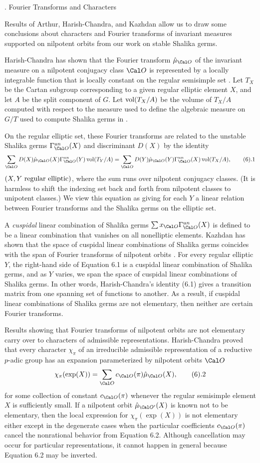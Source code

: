 . Fourier Transforms and Characters\endhead

Results of Arthur, Harish-Chandra, and Kazhdan allow us to draw some
conclusions about characters and Fourier transforms of invariant
measures supported on nilpotent
orbits from our work on stable Shalika germs.

Harish-Chandra has shown that the Fourier transform $\hat\mu_\O$ of
the invariant measure on a nilpotent conjugacy class $\O$ is
represented by a locally integrable function
that  is locally  constant
on the regular semisimple set \cite{HC}.  
Let $T_X$ be the Cartan subgroup corresponding to a given
regular elliptic element $X$, and let $A$ be the split
component of $G$.  Let $\operatorname{vol}(T_X/A)$ be the volume
of $T_X/A$ computed with respect to the measure 
used to define the algebraic measure on $G/T$ used
to compute Shalika germs in \cite{L}.

On the regular elliptic set, these Fourier
transforms are related to the
unstable Shalika germs $\Gamma^{un}_\O(X)$ 
and discriminant $D(X)$ by the identity \cite{HC}
$$\sum_\O D(X)\hat\mu_\O(X)\Gamma^{un}_\O(Y)\vvol(T_Y/A) = 
   \sum_\O D(Y)\hat\mu_\O(Y) \Gamma^{un}_\O(X)\vvol(T_X/A),
\tag6.1$$
$(X,Y \ \hbox{regular elliptic})$,
where the sum runs over nilpotent conjugacy classes.  (It is harmless
to shift the indexing set back and forth from nilpotent classes to
unipotent classes.)  We view this equation as giving for each $Y$ a
linear relation between Fourier transforms
 and
the Shalika germs
 on the elliptic set.

A {\it cuspidal\/} linear combination of Shalika germs
$\sum x_\O \Gamma^{un}_\O(X)$ is defined to be a linear combination that
vanishes on all nonelliptic elements.  Kazhdan has shown that the
space of cuspidal linear combinations of Shalika germs coincides with
the span of Fourier transforms of nilpotent orbits \cite{K}. For every
regular elliptic $Y$, the right-hand side of Equation 6.1 is a cuspidal
linear combination of Shalika germs, and as
$Y$ varies, we span the
space of cuspidal linear combinations of Shalika germs.
In other words, Harish-Chandra's identity (6.1) gives a transition
matrix from one spanning set of functions to another.  As a result,
if cuspidal linear combinations of Shalika germs are not elementary,
then neither are certain Fourier transforms.

Results showing that Fourier transforms of nilpotent orbits are
not 
elementary carry over to characters of admissible representations.
Harish-Chandra proved that every character $\chi_\pi$ of an
irreducible
admissible representation of a  reductive $p$-adic group has an
expansion parameterized by nilpotent orbits $\O$
$$\chi_\pi(\exp(X)) = \sum_\O c_\O(\pi) \hat\mu_\O(X),\tag6.2$$
for some collection of constant $c_\O(\pi)$
whenever the regular
semisimple element $X$ is sufficiently small.  If a nilpotent orbit
$\hat\mu_{\O'}(X)$ is known not to be elementary, then the local
expression for
$\chi_\pi(\exp(X))$ is not elementary either
except in the degenerate
cases when the particular coefficients $c_\O(\pi)$ cancel the
nonrational behavior from Equation 6.2.  
  Although cancellation may occur
for particular representations, it cannot happen in general because
Equation 6.2 may be inverted.  

